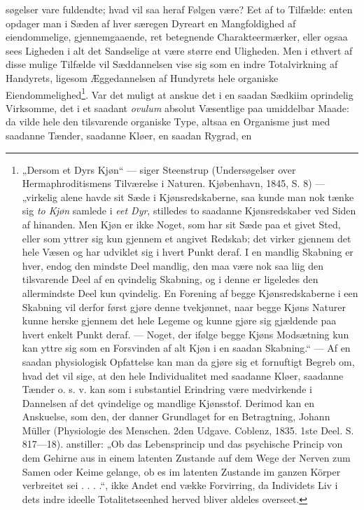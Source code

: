 \documentclass[12pt,a4paper]{book}
\begin{document}
\setcounter{footnote}{0}
søgelser vare fuldendte; hvad vil saa heraf Følgen være? Eet af to
Tilfælde: enten opdager man i Sæden af hver særegen Dyreart en
Mangfoldighed af eiendommelige, gjennemgaaende, ret betegnende
Charakteermærker, eller ogsaa sees Ligheden i alt det Sandselige at være
større end Uligheden. Men i ethvert af disse mulige Tilfælde vil
Sæddannelsen vise sig som en indre Totalvirkning af Handyrets, ligesom
Æggedannelsen af Hundyrets hele organiske
Eiendommelighed\footnote{„Dersom et Dyrs Kjøn“ --- siger Steenstrup
(Undersøgelser over Hermaphroditismens Tilværelse i Naturen. Kjøbenhavn,
1845, S. 8) --- „virkelig alene havde sit Sæde i Kjønsredskaberne, saa
kunde man nok tænke sig \emph{to Kjøn} samlede i \emph{eet Dyr}, stilledes
to saadanne Kjønsredskaber ved Siden af hinanden. Men Kjøn er ikke Noget,
som har sit Sæde paa et givet Sted, eller som yttrer sig kun gjennem et
angivet Redskab; det virker gjennem det hele Væsen og har udviklet sig i
hvert Punkt deraf. I en mandlig Skabning er hver, endog den mindste Deel
mandlig, den maa være nok saa liig den tilsvarende Deel af en qvindelig
Skabning, og i denne er ligeledes den allermindste Deel kun qvindelig. En
Forening af begge Kjønsredskaberne i een Skabning vil derfor først gjøre
denne tvekjønnet, naar begge Kjøns Naturer kunne herske gjennem det hele
Legeme og kunne gjøre sig gjældende paa hvert enkelt Punkt deraf. ---
Noget, der ifølge begge Kjøns Modsætning kun kan yttre sig som en
Forsvinden af alt Kjøn i en saadan Skabning.“ --- Af en saadan
physiologisk Opfattelse kan man da gjøre sig et fornuftigt Begreb om, hvad
det vil sige, at den hele Individualitet med saadanne Kløer, saadanne
Tænder o. s. v. kan som i substantiel Erindring være medvirkende i
Dannelsen af det qvindelige og mandlige Kjønsstof. Derimod kan en
Anskuelse, som den, der danner Grundlaget for en Betragtning, Johann
Müller (Physiologie des Menschen. 2den Udgave. Coblenz, 1835. 1ste Deel.
S. 817---18). anstiller: „Ob das Lebensprincip und das psychische Princip
von dem Gehirne aus in einem latenten Zustande auf dem Wege der Nerven zum
Samen oder Keime gelange, ob es im latenten Zustande im ganzen Körper
verbreitet sei . . . .“, ikke Andet end vække Forvirring, da Individets
Liv i dets indre ideelle Totalitetseenhed herved bliver aldeles
overseet.}. Var det muligt at anskue det i en saadan Sædkiim oprindelig
Virksomme, det i et saadant \textit{ovulum} absolut Væsentlige paa
umiddelbar Maade: da vilde hele den tilsvarende organiske Type, altsaa en
Organisme just med saadanne Tænder, saadanne Kløer, en saadan Rygrad, en
\end{document}
